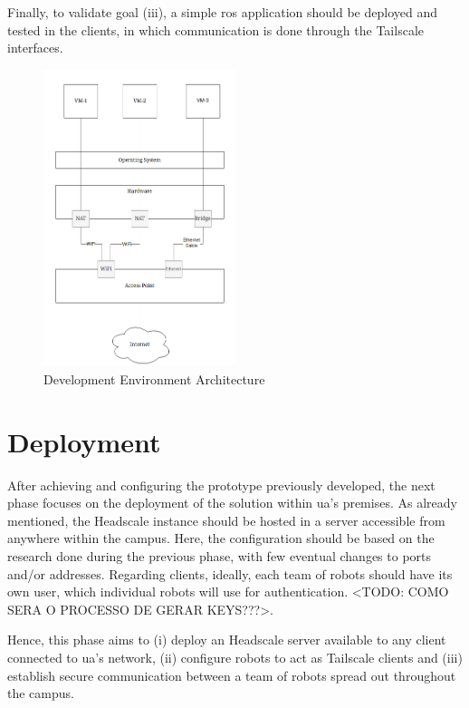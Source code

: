 \documentclass[11pt,twoside,a4paper]{report}
\begin{document}
Finally, to validate goal (iii), a simple \ac{ros} application should be deployed and tested in the clients, in which communication is done through the Tailscale interfaces.

\begin{figure}[h]
\centering
\includegraphics[width=0.5\textwidth]{dev.png}
\caption{Development Environment Architecture}
\label{fig:sandbox}
\end{figure}


\section{Deployment}

After achieving and configuring the prototype previously developed, the next phase focuses on the deployment of the solution within \ac{ua}'s premises. As already mentioned, the Headscale instance should be hosted in a server accessible from anywhere within the campus. Here, the configuration should be based on the research done during the previous phase, with few eventual changes to ports and/or addresses. Regarding clients, ideally, each team of robots should have its own user, which individual robots will use for authentication. <TODO: COMO SERA O PROCESSO DE GERAR KEYS???>.

Hence, this phase aims to (i) deploy an Headscale server available to any client connected to \ac{ua}'s network, (ii) configure robots to act as Tailscale clients and (iii) establish secure communication between a team of robots spread out throughout the campus.
\end{document}

